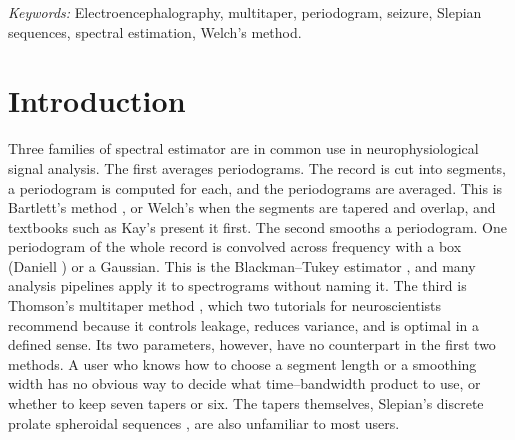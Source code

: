\documentclass[10pt,twocolumn]{article}
\begin{document}
\begin{abstract}
\textit{Significance:} Because the methods are equivalent, analysts can work in whichever form makes their choices most transparent. A smoothing kernel of explicit width, applied to a lightly tapered periodogram, shows the frequency resolution and the resulting variance directly. Analysts can then set both from the features of their data. For example, they can use a window no longer than a seizure rhythm stays stationary, and a kernel narrow enough to resolve the spindle peak within the sigma band.
\end{abstract}

\noindent\textit{Keywords:} Electroencephalography, multitaper, periodogram, seizure, Slepian sequences, spectral estimation, Welch's method.

\section{Introduction}
\label{sec:introduction}
Three families of spectral estimator are in common use in neurophysiological signal analysis. The first averages periodograms. The record is cut into segments, a periodogram is computed for each, and the periodograms are averaged. This is Bartlett's method \cite{bartlett1948}, or Welch's \cite{welch1967} when the segments are tapered and overlap, and textbooks such as Kay's \cite{kay1988} present it first. The second smooths a periodogram. One periodogram of the whole record is convolved across frequency with a box (Daniell \cite{daniell1946}) or a Gaussian. This is the Blackman--Tukey estimator \cite{blackman1958}, and many analysis pipelines apply it to spectrograms without naming it. The third is Thomson's multitaper method \cite{thomson1982}, which two tutorials for neuroscientists \cite{babadi2014,prerau2017} recommend because it controls leakage, reduces variance, and is optimal in a defined sense. Its two parameters, however, have no counterpart in the first two methods. A user who knows how to choose a segment length or a smoothing width has no obvious way to decide what time--bandwidth product to use, or whether to keep seven tapers or six. The tapers themselves, Slepian's discrete prolate spheroidal sequences \cite{slepian1978}, are also unfamiliar to most users.
\end{document}

